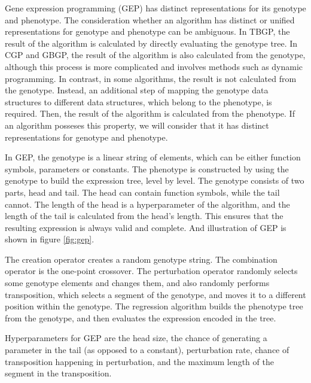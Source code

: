 Gene expression programming (GEP) \citep{gep} has distinct representations for its genotype and phenotype. The consideration whether an algorithm has distinct or unified representations for genotype and phenotype can be ambiguous. In TBGP, the result of the algorithm is calculated by directly evaluating the genotype tree. In CGP and GBGP, the result of the algorithm is also calculated from the genotype, although this process is more complicated and involves methods such as dynamic programming. In contrast, in some algorithms, the result is not calculated from the genotype. Instead, an additional step of mapping the genotype data structures to different data structures, which belong to the phenotype, is required. Then, the result of the algorithm is calculated from the phenotype. If an algorithm posseses this property, we will consider that it has distinct representations for genotype and phenotype.

In GEP, the genotype is a linear string of elements, which can be either function symbols, parameters or constants. The phenotype is constructed by using the genotype to build the expression tree, level by level. The genotype consists of two parts, head and tail. The head can contain function symbols, while the tail cannot. The length of the head is a hyperparameter of the algorithm, and the length of the tail is calculated from the head's length. This ensures that the resulting expression is always valid and complete. And illustration of GEP is shown in figure \ref{fig:gep}.

The creation operator creates a random genotype string. The combination operator is the one-point crossover. The perturbation operator randomly selects some genotype elements and changes them, and also randomly performs transposition, which selects a segment of the genotype, and moves it to a different position within the genotype. The regression algorithm builds the phenotype tree from the genotype, and then evaluates the expression encoded in the tree.

Hyperparameters for GEP are the head size, the chance of generating a parameter in the tail (as opposed to a constant), perturbation rate, chance of transposition happening in perturbation, and the maximum length of the segment in the transposition.

